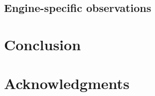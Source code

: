 \documentclass{IEEEtran}
\begin{document}

\subsection{Engine-specific observations}


\section{Conclusion} %



\section{Acknowledgments}


 

\end{document}
